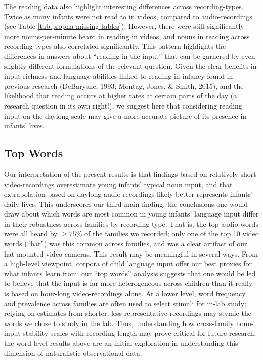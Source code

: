\documentclass[man]{apa6}
\theoremstyle{definition}
\theoremstyle{definition}
\theoremstyle{definition}
\theoremstyle{remark}
\begin{document}
The reading data also highlight interesting differences across
recording-types. Twice as many infants were not read to in videos,
compared to audio-recordings (see Table
\ref{tab:propna-missing-tables}). However, there were still
significantly more nouns-per-minute heard in reading in videos, and
nouns in reading across recording-types also correlated significantly.
This pattern highlights the differences in answers about
\enquote{reading in the input} that can be garnered by even slightly
different formulations of the relevant question. Given the clear
benefits in input richness and language abilities linked to reading in
infancy found in previous research (DeBaryshe, 1993; Montag, Jones, \&
Smith, 2015), and the likelihood that reading occurs at higher rates at
certain parts of the day (a research question in its own right!), we
suggest here that considering reading input on the daylong scale may
give a more accurate picture of its presence in infants' lives.

\subsection{Top Words}\label{top-words}

Our interpretation of the present results is that findings based on
relatively short video-recordings overestimate young infants' typical
noun input, and that extrapolation based on daylong audio-recordings
likely better represents infants' daily lives. This underscores our
third main finding: the conclusions one would draw about which words are
most common in young infants' language input differ in their robustness
across families by recording-type. That is, the top audio words were all
heard by \(\geq 75\%\) of the families we recorded; only one of the top
10 video words (\enquote{hat}) was this common across families, and was
a clear artifact of our hat-mounted video-cameras. This result may be
meaningful in several ways. From a high-level viewpoint, corpora of
child language input offer our best proxies for what infants learn from:
our \enquote{top words} analysis suggests that one would be led to
believe that the input is far more heterogeneous across children than it
really is based on hour-long video-recordings alone. At a lower level,
word frequency and prevalence across families are often used to select
stimuli for in-lab study; relying on estimates from shorter, less
representative recordings may stymie the words we chose to study in the
lab. Thus, understanding how cross-family noun-input stability scales
with recording-length may prove critical for future research; the
word-level results above are an initial exploration in understanding
this dimension of naturalistic observational data.
\end{document}
